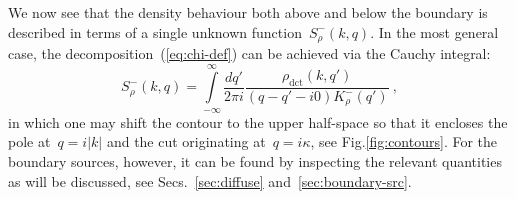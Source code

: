 \documentclass[preprint,aps,eqsecnum, prb]{revtex4-1}
\newcommand{\fminus}[1]{{#1}^{-}}
\newcommand{\dct}[1]{{#1}_\mathrm{dct}}
\begin{document}
We now see that the density behaviour both above and below the
boundary is described in terms of a single unknown
function~$\fminus{S}_\rho(k, q)$. In the most  general case,
the decomposition~(\ref{eq:chi-def})  can be achieved via the Cauchy integral:
\begin{equation}
  \label{eq:solution-chi}
  \fminus{S}_\rho(k, q) = \int\limits_{-\infty}^{\infty} \frac{dq'}{2\pi i}
  \frac{\dct{\rho}(k, q')}{(q - q' - i0) \fminus{K}_\rho(q')}
  \ ,
\end{equation}
in which one may shift the contour to the upper half-space so that
it encloses the pole at~$q = i |k|$ and the cut originating
at~$q = i \kappa$, see Fig.\ref{fig:contours}.
For the boundary sources, however, it can be found by inspecting
the relevant quantities as will be discussed,
see Secs.~\ref{sec:diffuse} and~\ref{sec:boundary-src}.
\end{document}
